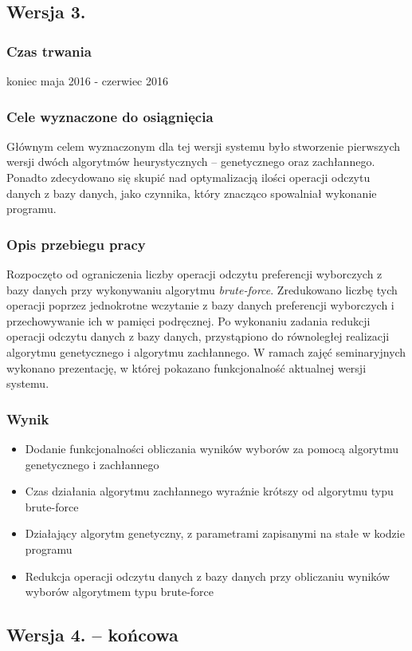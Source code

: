 \documentclass[pdflatex,11pt]{../aghdoc_version2}
\begin{document}
\subsection{Wersja 3.}
\subsubsection{Czas trwania}
koniec maja 2016 - czerwiec 2016
\subsubsection{Cele wyznaczone do osiągnięcia}
Głównym celem wyznaczonym dla tej wersji systemu było stworzenie pierwszych wersji
dwóch algorytmów heurystycznych – genetycznego oraz zachłannego. 
Ponadto zdecydowano się skupić nad optymalizacją ilości operacji odczytu danych z bazy danych, jako czynnika, 
który znacząco spowalniał wykonanie programu.
\subsubsection{Opis przebiegu pracy}
Rozpoczęto od ograniczenia liczby operacji odczytu preferencji wyborczych z bazy danych
przy wykonywaniu algorytmu \textit{brute-force}. Zredukowano liczbę tych operacji poprzez
jednokrotne wczytanie z bazy danych preferencji wyborczych i przechowywanie ich w pamięci podręcznej.
Po wykonaniu zadania redukcji operacji odczytu danych z bazy danych,
przystąpiono do równoległej realizacji algorytmu genetycznego i algorytmu zachłannego. W
ramach zajęć seminaryjnych wykonano prezentację, w której pokazano funkcjonalność
aktualnej wersji systemu.
\subsubsection{Wynik}
\begin{itemize}
\item Dodanie funkcjonalności obliczania wyników wyborów za pomocą algorytmu
genetycznego i zachłannego
\item Czas działania algorytmu zachłannego wyraźnie krótszy od algorytmu typu
brute-force
\item Działający algorytm genetyczny, z parametrami zapisanymi na stałe w kodzie programu
\item Redukcja operacji odczytu danych z bazy danych przy obliczaniu wyników wyborów
algorytmem typu brute-force
\end{itemize}

\newpage
\subsection{Wersja 4. – końcowa}
\end{document}
